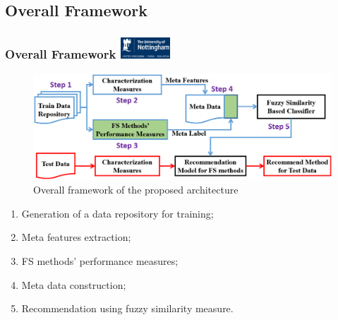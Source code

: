 \documentclass[aspectratio=1610]{beamer}
\newcommand{\UoN}
  {\hfill {\includegraphics[height=0.8cm]{nott_logo/nott_logo_white.png}}}
\begin{document}
\subsection{Overall Framework}
\begin{frame}
\frametitle{Overall Framework \UoN}
	\begin{figure}
    	\includegraphics[scale=0.33]{Figures/Overall_Framework_step.png}
    	\caption{\scriptsize{Overall framework of the proposed architecture}}
    \end{figure}

  	\begin{enumerate}
  		\item Generation of a data repository for training;
  		\item Meta features extraction;
  		\item FS methods' performance measures;
  		\item Meta data construction;
  		\item Recommendation using fuzzy similarity measure.
  	\end{enumerate}
\end{frame}
\end{document}
